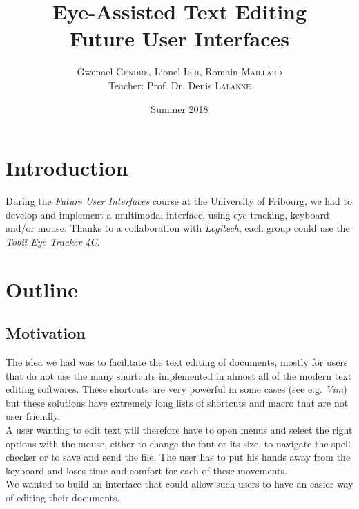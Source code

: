 \documentclass[12pt, a4paper]{article}
\title{\huge{\textbf{Eye-Assisted Text Editing }\\ Future User Interfaces}}
\author{Gwenael \textsc{Gendre}, Lionel \textsc{Ieri}, Romain \textsc{Maillard} \\
	Teacher: Prof. Dr. Denis \textsc{Lalanne}}
\date{Summer 2018}
\begin{document}
 
\begin{titlepage}
\maketitle
\end{titlepage}
\tableofcontents
\newpage

\section{Introduction}
During the \textit{Future User Interfaces} course at the University of Fribourg, we had to develop and implement a multimodal interface, using eye tracking, keyboard and/or mouse. Thanks to a collaboration with \textit{Logitech}, each group could use the \textit{Tobii Eye Tracker 4C}. 

\section{Outline}

\subsection{Motivation}
The idea we had was to facilitate the text editing of documents, mostly for users that do not use the many shortcuts implemented in almost all of the modern text editing softwares. These shortcuts are very powerful in some cases (see e.g. \textit{Vim}) but these solutions have extremely long lists of shortcuts and macro that are not user friendly.\\
A user wanting to edit text will therefore have to open menus and select the right options with the mouse, either to change the font or its size, to navigate the spell checker or to save and send the file. The user has to put his hands away from the keyboard and loses time and comfort for each of these movements. \\
We wanted to build an interface that could allow such users to have an easier way of editing their documents. 
\end{document}
